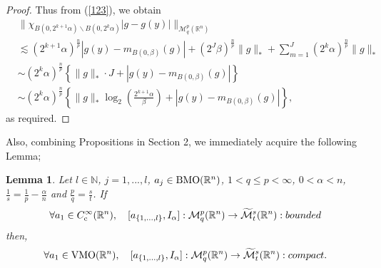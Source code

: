 \documentclass[11pt,a4]{article}
\numberwithin{equation}{section}
\newtheorem{lemma}[theorem]{Lemma}
\theoremstyle{definition}
\theoremstyle{remark}
\begin{document}
\begin{proof}
	Thus from (\ref{123}), we obtain 
	\begin{align*}
		&\| \chi_{B(0,2^{k+1}\alpha) \backslash B(0,2^k\alpha)} |g-g(y)| \|_{{\mathcal M}{}^p_q({\mathbb R}^n)}\\
		&\lesssim (2^{k+1}\alpha)^{\frac{n}{p}} |g(y)-m_{B(0,\beta)}(g)| + (2^J\beta)^{\frac{n}{p}} \|g\|_* + \sum_{m=1}^{J}(2^k\alpha)^{\frac{n}{p}} \|g\|_* \\
		&\sim (2^k\alpha)^{\frac{n}{p}} \left\{ \|g\|_* \cdot J + |g(y) - m_{B(0,\beta)}(g)| \right\}\\
		&\sim (2^k\alpha)^{\frac{n}{p}} \left\{ \|g\|_* \log_2 \left(\frac{2^{k+1}\alpha}{\beta} \right) + |g(y) - m_{B(0,\beta)}(g)| \right\},
	\end{align*}
	as required.
\end{proof}

Also, combining Propositions in Section 2, we immediately acquire the following Lemma; 

\begin{lemma}\label{apr}
Let $l \in \mathbb N$, $j=1,...,l$, $a_j \in {\rm BMO}({\mathbb R}^n)$, $1 < q \le p < \infty$, $0 < \alpha < n$, $\frac{1}{s}=\frac{1}{p}-\frac{\alpha}{n}$ and $\frac{p}{q}=\frac{s}{t}$. If
	\begin{align*}
		\forall a_1 \in C^\infty_{\rm c}({\mathbb R}^n), \quad [a_{\{1, ... , l\}},I_{\alpha}]: {\mathcal M}^{p}_q({\mathbb R}^n) \rightarrow \widetilde{\mathcal M}^{s}_t({\mathbb R}^n):bounded
	\end{align*}
then, 
	\begin{align*}
		\forall a_1 \in {\rm VMO}({\mathbb R}^n), \quad [a_{\{1, ... , l\}},I_{\alpha}]: {\mathcal M}^{p}_q({\mathbb R}^n) \rightarrow \widetilde{\mathcal M}^{s}_t({\mathbb R}^n):compact.
	\end{align*}

\end{lemma}
\end{document}
